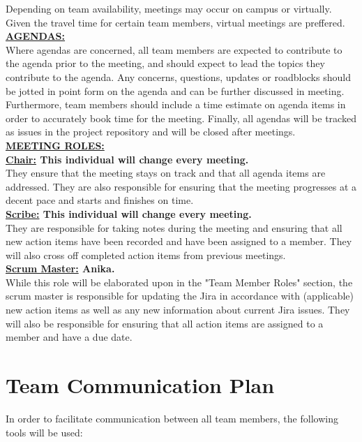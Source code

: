 \documentclass{article}
\begin{document}
Depending on team availability, meetings may occur on campus or virtually. 
Given the travel time for certain team members, virtual meetings are preffered.\\

\noindent \textbf{\underline{AGENDAS:}} \\

Where agendas are concerned, all team members are expected to contribute to the agenda prior to the meeting, and should expect to lead the topics they contribute to the agenda. 
Any concerns, questions, updates or roadblocks should be jotted in point form on the agenda and can be further discussed in meeting. 
Furthermore, team members should include a time estimate on agenda items in order to accurately book time for the meeting.
Finally, all agendas will be tracked as issues in the project repository and will be closed after meetings. \\

\noindent \textbf{\underline{MEETING ROLES:}} \\

\noindent \textbf{\underline{Chair:} This individual will change every meeting. } \\
\noindent They ensure that the meeting stays on track and that all agenda items are addressed. 
They are also responsible for ensuring that the meeting progresses at a decent pace and starts and finishes on time. \\

\noindent \textbf{\underline{Scribe:} This individual will change every meeting.} \\
\noindent They are responsible for taking notes during the meeting and ensuring that all new action items have been recorded and have been assigned to a member.
They will also cross off completed action items from previous meetings.\\

\noindent \textbf{\underline{Scrum Master:} Anika.} \\
\noindent While this role will be elaborated upon in the "Team Member Roles" section, the scrum master is responsible for updating the Jira in accordance with (applicable) new action items as well as any new information about current Jira issues.
They will also be responsible for ensuring that all action items are assigned to a member and have a due date.\\



\section{Team Communication Plan}
In order to facilitate communication between all team members, the following tools will be used:
\end{document}
